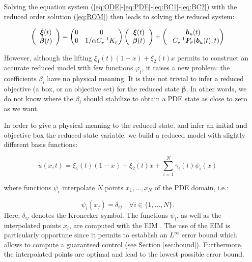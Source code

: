 Solving the equation system (\ref{eq:ODE}-\ref{eq:PDE}-\ref{eq:BC1}-\ref{eq:BC2})
with the reduced order solution (\ref{eq:ROM}) then leads to solving
the reduced system:


\begin{equation}
\label{eq:sys_red}
  \left( \begin{array}{c}
  \dot{\bm{\xi}}(t) \\ \dot{\bm{\beta}}(t)
 \end{array} \right) = \left( \begin{matrix} 0 & 0 \\ 0 & 1/\alpha C_r^{-1} K_r \end{matrix} \right)\left( \begin{array}{c}
   \bm{\xi}(t) \\ \bm{\beta}(t)
 \end{array} \right) + \begin{pmatrix}
                        \bm{b}_u(t) \\ -C_r^{-1} \bm{F_r}(\bm{b}_u(t),t)
                       \end{pmatrix}
\end{equation}



However, although the lifting $\xi_1(t)(1-x) + \xi_2(t)x$ permits to construct an accurate reduced model 
with few functions $\varphi_i$, it raises a new problem:
the coefficients $\beta_i$ have no physical meaning. 
It is thus not trivial to infer a reduced objective (a box, or an objective set)
for the reduced state $\bm{\beta}$. In other words, we do not know 
where the $\beta_i$ should stabilize to obtain a PDE state as close to zero as we want. 

In order to give a physical meaning to the reduced state, and infer an initial and objective
box the reduced state variable, we build a reduced model with slightly 
different basis functions:

\begin{equation}
\tilde u(x,t) =  \xi_1(t)(1-x) + \xi_2(t)x + \sum_{i = 1}^N \gamma_i (t) \psi_i (x)
\end{equation}

where functions $\psi_i$ interpolate $N$ points $x_1, \dots, x_N$  of the PDE domain, i.e.:

\begin{equation}
 \psi_i (x_j) = \delta_{ij} \quad \forall i \in \{1,\dots,N \}.
 \label{eq:interp}
 \end{equation}
Here, $\delta_{ij}$ denotes the Kronecker symbol.
The functions $\psi_i$, as well as the interpolated points $x_i$, are 
computed with the EIM \cite{maday2007general}. The use of the EIM is particularly 
opportune since it permits to establish an $L^\infty$ error bound which 
allows to compute a guaranteed control (see Section \ref{sec:bound}).
Furthermore, the interpolated points are optimal and lead to the lowest possible error bound.

